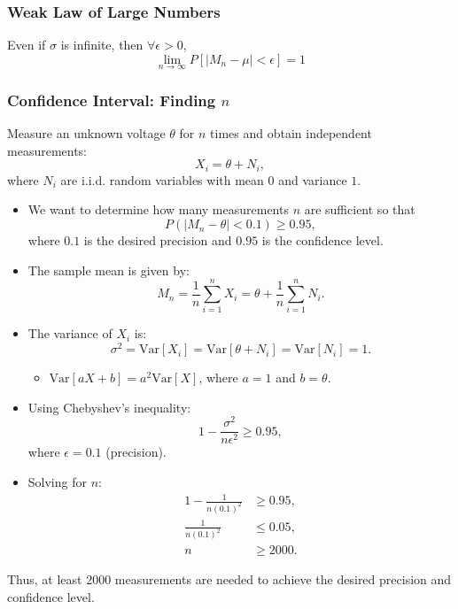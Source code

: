 \subsubsection{Weak Law of Large Numbers}
\begin{definition}
    Even if $\sigma$ is infinite, then $\forall \epsilon > 0$, 
    \begin{equation*}
        \lim_{n \to \infty} P\left[|M_n - \mu| < \epsilon\right] = 1
    \end{equation*}
\end{definition}

\subsubsection{Confidence Interval: Finding $n$}
\begin{example}
    Measure an unknown voltage $\theta$ for $n$ times and obtain independent measurements:
    \[
    X_i = \theta + N_i,
    \]
    where $N_i$ are i.i.d. random variables with mean $0$ and variance $1$.

    \begin{itemize}
        \item We want to determine how many measurements $n$ are sufficient so that 
        \[
        P\left(|M_n - \theta| < 0.1\right) \geq 0.95,
        \]
        where $0.1$ is the desired precision and $0.95$ is the confidence level.
        
        \item The sample mean is given by:
        \[
        M_n = \frac{1}{n} \sum_{i=1}^n X_i = \theta + \frac{1}{n} \sum_{i=1}^n N_i.
        \]

        \item The variance of $X_i$ is:
        \[
        \sigma^2 = \text{Var}[X_i] = \text{Var}[\theta + N_i] = \text{Var}[N_i] = 1.
        \]
        \begin{itemize}
            \item $\text{Var}[aX + b] = a^2 \text{Var}[X]$, where $a = 1$ and $b = \theta$.
        \end{itemize}

        \item Using Chebyshev's inequality:
        \[
        1 - \frac{\sigma^2}{n\epsilon^2} \geq 0.95,
        \]
        where $\epsilon = 0.1$ (precision).

        \item Solving for $n$:
        \begin{align*}
        1 - \frac{1}{n(0.1)^2} &\geq 0.95, \\
        \frac{1}{n(0.1)^2} &\leq 0.05, \\
        n &\geq 2000.
        \end{align*}
    \end{itemize}

    Thus, at least $2000$ measurements are needed to achieve the desired precision and confidence level.
\end{example}

